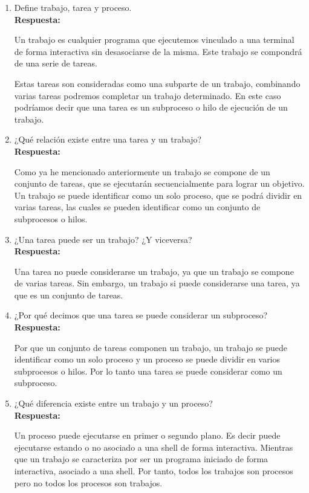 \documentclass[a4paper,12pt]{article}
\begin{document}
\begin{enumerate}[label=\textbf{Pregunta \arabic*.}]
    \item Define trabajo, tarea y proceso. \\
    \textbf{Respuesta:} 

    Un trabajo es cualquier programa que ejecutemos vinculado a una terminal de forma interactiva sin desasociarse de la misma. Este trabajo se compondrá de una serie de tareas.

    Estas tareas son consideradas como una subparte de un trabajo, combinando varias tareas podremos completar un trabajo determinado. En este caso podríamos decir que una tarea es un subproceso o hilo de ejecución de un trabajo.


    \item ¿Qué relación existe entre una tarea y un trabajo? \\
    \textbf{Respuesta:} 
    
    Como ya he mencionado anteriormente un trabajo se compone de un conjunto de tareas, que se ejecutarán secuencialmente para lograr un objetivo. Un trabajo se puede identificar como un solo proceso, que se podrá dividir en varias tareas, las cuales se pueden identificar como un conjunto de subprocesos o hilos. 




    \item ¿Una tarea puede ser un trabajo? ¿Y viceversa? \\
    \textbf{Respuesta:} 


    Una tarea no puede considerarse un trabajo, ya que un trabajo se compone de varias tareas. Sin embargo, un trabajo si puede considerarse una tarea, ya que es un conjunto de tareas.
    

    \item ¿Por qué decimos que una tarea se puede considerar un subproceso? \\
    \textbf{Respuesta:} 
    
    Por que un conjunto de tareas componen un trabajo, un trabajo se puede identificar como un solo proceso y un proceso se puede dividir en varios subprocesos o hilos. Por lo tanto una tarea se puede considerar como un subproceso.


    \item ¿Qué diferencia existe entre un trabajo y un proceso? \\
    \textbf{Respuesta:} 
    
    Un proceso puede ejecutarse en primer o segundo plano. Es decir puede ejecutarse estando o no asociado a una shell de forma interactiva. Mientras que un trabajo se caracteriza por ser un programa iniciado de forma interactiva, asociado a una shell. Por tanto, todos los trabajos son procesos pero no todos los procesos son trabajos.



\end{enumerate}
\end{document}
